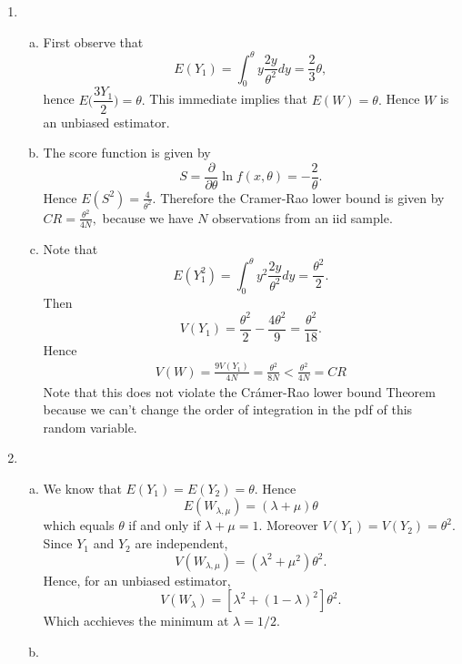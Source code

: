 \documentclass[10pt]{article}
\newcommand{\pa}{\partial}
\begin{document}
\begin{enumerate}

\item 
\begin{enumerate}[(a)]
    \item First observe that $$E(Y_1) = \int_0^{\theta}y\dfrac{2y}{\theta^2}dy = \dfrac{2}{3}\theta,$$
hence $E\Big(\dfrac{3Y_1}{2}\Big) = \theta.$ This immediate implies that $E(W) = \theta.$ Hence $W$ is an unbiased estimator.
   
    \item The score function is given by $$S = \frac{\pa}{\pa \theta}\ln f(x,\theta) = -\frac{2}{\theta}.$$
    Hence $E(S^2) = \frac{4}{\theta^2}.$ Therefore the Cramer-Rao lower bound is given by $CR = \frac{\theta^2}{4N},$ because we have $N$ observations from an iid sample.
    
    \item Note that 
    $$E(Y_1^2) = \int_0^{\theta}y^2\frac{2y}{\theta^2}dy = \frac{\theta^2}{2}.$$
    Then $$V(Y_1) = \frac{\theta^2}{2} - \frac{4\theta^2}{9} =\frac{\theta^2}{18}.$$
    Hence 
    \begin{align*}
        V(W) = \frac{9V(Y_1)}{4N} = \frac{\theta^2}{8N} < \frac{\theta^2}{4N} = CR 
    \end{align*}
    Note that this does not violate the Crámer-Rao lower bound Theorem because we can't change the order of integration in the pdf of this random variable.
\end{enumerate}


\item 
\begin{enumerate}[(a)]
    \item We know that $E(Y_1) = E(Y_2) = \theta.$ Hence $$E(W_{\lambda,\mu}) = (\lambda + \mu)\theta $$
    which equals $\theta$ if and only if $\lambda + \mu = 1.$ Moreover $V(Y_1) = V(Y_2) = \theta^2.$ Since $Y_1$ and $Y_2$ are independent, 
    $$V(W_{\lambda,\mu}) = (\lambda^2 + \mu^2)\theta^2.$$ 
    Hence, for an unbiased estimator, 
    $$V(W_\lambda) = [\lambda^2 + (1-\lambda)^2]\theta^2.$$
    Which acchieves the minimum at $\lambda = 1/2.$
    \item 
\end{enumerate}



\end{enumerate}
\end{document}
